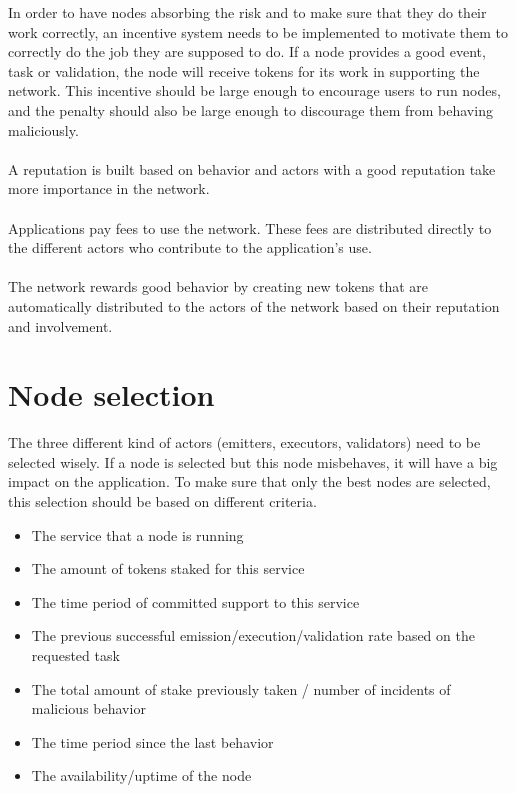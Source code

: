 \documentclass[12pt,a4paper,final]{article}
\begin{document}
In order to have nodes absorbing the risk and to make sure that they do their work correctly, an incentive system needs to be implemented to motivate them to correctly do the job they are supposed to do. If a node provides a good event, task or validation, the node will receive tokens for its work in supporting the network. This incentive should be large enough to encourage users to run nodes, and the penalty should also be large enough to discourage them from behaving maliciously. 
\\\\
A reputation is built based on behavior and actors with a good reputation take more importance in the network.
\\\\
Applications pay fees to use the network. These fees are distributed directly to the different actors who contribute to the application’s use.
\\\\
The network rewards good behavior by creating new tokens that are automatically distributed to the actors of the network based on their reputation and involvement.

\section{Node selection}

The three different kind of actors (emitters, executors, validators) need to be selected wisely. If a node is selected but this node misbehaves, it will have a big impact on the application. To make sure that only the best nodes are selected, this selection should be based on different criteria.

\begin{itemize}
\item The service that a node is running
\item The amount of tokens staked for this service
\item The time period of committed support to this service
\item The previous successful emission/execution/validation rate based on the requested task
\item The total amount of stake previously taken / number of incidents of malicious behavior
\item The time period since the last behavior
\item The availability/uptime of the node
\end{itemize}
\end{document}
